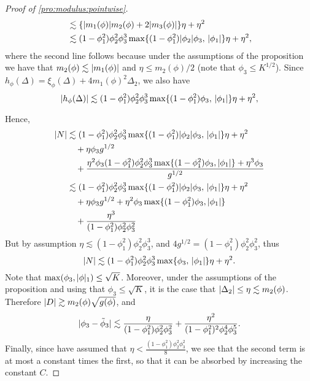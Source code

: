 \documentclass[journal]{IEEEtran}
\newcommand{\1}{\boldsymbol{1}}
\DeclarePairedDelimiter{\braces}{\{}{\}}
\DeclarePairedDelimiter{\brackets}{(}{)}
\DeclarePairedDelimiter{\abs}{\lvert}{\rvert}
\begin{document}
\begin{proof}[Proof of \cref{pro:modulus:pointwise}]
\begin{align*}
		&\lesssim \braces{\abs{m_1(\phi)}m_2(\phi) + 2\abs{m_3(\phi) }}\eta + \eta^2\\
		&\lesssim (1-\phi_1^2)\phi_2^2\phi_3^3 \max\braces{ (1-\phi_1^2) \abs{\phi_2}\phi_3,\, \abs{\phi_1}}\eta + \eta^2,
	\end{align*}
	where the second line follows because under the assumptions of the proposition we have that $m_2(\phi) \lesssim \abs{m_1(\phi)}$ and $\eta \leq m_2(\phi)/2$ (note that $\phi_3\leq K^{1/2}$). Since
	$h_{\phi}(\Delta) = \xi_{\phi}(\Delta) + 4m_1(\phi)^2\Delta_2$, we also have
	\begin{equation*}
		\abs{h_{\phi}(\Delta)}%
		\lesssim%
		(1-\phi_1^2)\phi_2^2\phi_3^3 \max\braces{ (1-\phi_1^2)\phi_3,\, \abs{\phi_1}}\eta + \eta^2,
	\end{equation*}

	Hence,
	\begin{align*}
		\abs{N}%
		&\lesssim%
		(1-\phi_1^2)\phi_2^2\phi_3^3 \max\braces{ (1-\phi_1^2) \abs{\phi_2}\phi_3,\, \abs{\phi_1}}\eta + \eta^2\\
		&\quad + \eta \phi_3 g^{1/2}\\%
          &\quad%
		+ \frac{\eta^2\phi_3(1-\phi_1^2)\phi_2^2\phi_3^3\max\braces{(1-\phi_1^2)\phi_3,\abs{\phi_1}} + \eta^3\phi_3 }{g^{1/2}}\\
		& \lesssim%
		(1-\phi_1^2)\phi_2^2\phi_3^3 \max\braces{ (1-\phi_1^2) \abs{\phi_2}\phi_3,\, \abs{\phi_1}}\eta + \eta^2\\
		&\quad + \eta \phi_3 g^{1/2}%
                  + \eta^2\phi_3\max\braces{(1-\phi_1^2)\phi_3,\abs{\phi_1}}\\%
          &\quad%
		+ \frac{\eta^3}{(1-\phi_1^2)\phi_2^2\phi_3^2}
	\end{align*}
	But by assumption $\eta \lesssim (1-\phi_1^2)\phi_2^2\phi_3^3$, and $4g^{1/2} = (1-\phi_1^2)\phi_2^2\phi_3^2$, thus
	\begin{equation*}
		\abs{N}%
		\lesssim
		(1-\phi_1^2)\phi_2^2\phi_3^3 \max\braces{\phi_3,\, \abs{\phi_1}}\eta + \eta^2.
	\end{equation*}
	Note that $\max\brackets{\phi_3,\abs{\phi}_1}\leq \sqrt{K}$.	Moreover, under the assumptions of the proposition and using that $\phi_3\leq \sqrt{K}$, it is
	the case that $\abs{\Delta_2} \leq \eta \lesssim m_2(\phi)$.
	Therefore $\abs{D} \gtrsim m_2(\phi) \sqrt{g(\phi)}$, and
	\begin{equation*}
		\abs{\phi_3 - \tilde{\phi}_3}%
		\lesssim \frac{\eta }{(1 - \phi_1^2)\phi_2^2\phi_3^2}%
		+ \frac{\eta^2}{(1-\phi_1^2)^2\phi_2^4\phi_3^5}.
	\end{equation*}
	Finally, since have assumed that $\eta<\frac{(1-\phi_1^2)\phi_2^2\phi_3^2}{8}$, we see that the second term is at most a constant times the first, so that it can be absorbed by increasing the constant $C$.
\end{proof}
\end{document}
